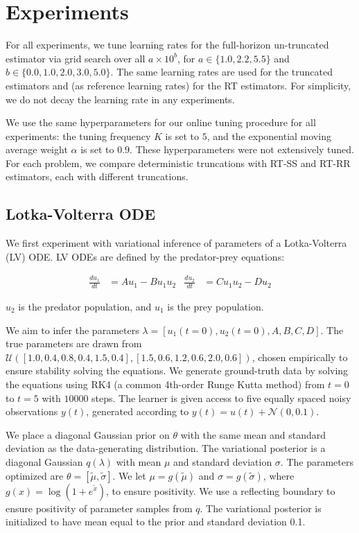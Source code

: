 
\section{Experiments}
For all experiments, we tune learning rates for the full-horizon un-truncated estimator via grid search over all ${a \times 10^b}$, for ${a \in \{1.0, 2.2, 5.5\}}$ and ${b \in \{0.0, 1.0, 2.0, 3.0, 5.0\}}$.
The same learning rates are used for the truncated estimators and (as reference learning rates) for the RT estimators.
For simplicity, we do not decay the learning rate in any experiments.

We use the same hyperparameters for our online tuning procedure for all experiments: the tuning frequency $K$ is set to $5$, and the exponential moving average weight $\alpha$ is set to $0.9$.
These hyperparameters were not extensively tuned.
For each problem, we compare deterministic truncations with RT-SS and RT-RR estimators, each with different truncations.

\subsection{Lotka-Volterra ODE}
We first experiment with variational inference of parameters of a Lotka-Volterra (LV) ODE. LV ODEs are defined by the predator-prey equations:
\vspace{-1.5\baselineskip}

\begin{align*}
\frac{du_1}{dt} &= A u_1 - B u_1 u_2 &
\frac{du_2}{dt} &= C u_1 u_2 - D u_2
\end{align*}
\vspace{-1.5\baselineskip}

$u_2$ is the predator population, and $u_1$ is the prey population.

We aim to infer the parameters $\lambda = [u_1(t=0), u_2(t=0), A, B, C, D]$.
The true parameters are drawn from $\mathcal{U}([1.0, 0.4, 0.8, 0.4, 1.5, 0.4], [1.5, 0.6, 1.2, 0.6, 2.0, 0.6])$, chosen empirically to ensure stability solving the equations.
We generate ground-truth data by solving the equations using RK4 (a common 4th-order Runge Kutta method) from $t = 0$ to $t = 5$ with $10000$ steps.
The learner is given access to five equally spaced noisy observations $y(t)$, generated according to $y(t) = u(t) + \mathcal{N}(0, 0.1)$.

We place a diagonal Gaussian prior on $\theta$ with the same mean and standard deviation as the data-generating distribution.
The variational posterior is a diagonal Gaussian $q(\lambda)$ with mean $\mu$ and standard deviation $\sigma$.
The parameters optimized are $\theta = [\tilde{\mu}, \tilde{\sigma}]$.
We let $\mu = g(\tilde{\mu})$ and $\sigma = g(\tilde{\sigma})$, where $g(x) = \log(1+e^{\tilde{x}})$, to ensure positivity.
We use a reflecting boundary to ensure positivity of parameter samples from $q$.
The variational posterior is initialized to have mean equal to the prior and standard deviation 0.1.

